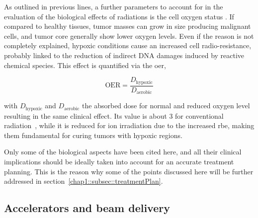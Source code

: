 As outlined in previous lines, a further parameters to account for in the evaluation of the biological effects of radiations is the cell oxygen status . If compared to healthy tissues, tumor masses can grow in size producing malignant cells, and tumor core generally show lower oxygen levels. Even if the reason is not completely explained, hypoxic conditions cause an increased cell radio-resistance, probably linked to the reduction of indirect DNA damages induced by reactive chemical species. This effect is quantified via the \gls{oer}, 

\begin{equation}
\mathrm{OER} = \frac{D_{\mathrm{hypoxic}}}{D_{\mathrm{aerobic}}}
\label{chap1::eq::oer}
\end{equation}

with $D_{\mathrm{hypoxic}}$ and $D_{\mathrm{aerobic}}$ the absorbed dose for normal and reduced oxygen level resulting in the same clinical effect. Its value is about 3 for conventional radiation~\parencite{Schardt2010}, while it is reduced for ion irradiation due to the increased \gls{rbe}, making them fundamental for curing tumors with hypoxic regions.

Only some of the biological aspects have been cited here, and all their clinical implications should be ideally taken into account for an accurate treatment planning. This is the reason why some of the points discussed here will be further addressed in section~\ref{chap1::subsec::treatmentPlan}. 

\subsection{Accelerators and beam delivery}\label{chap1::subsec::beamDelivery}

